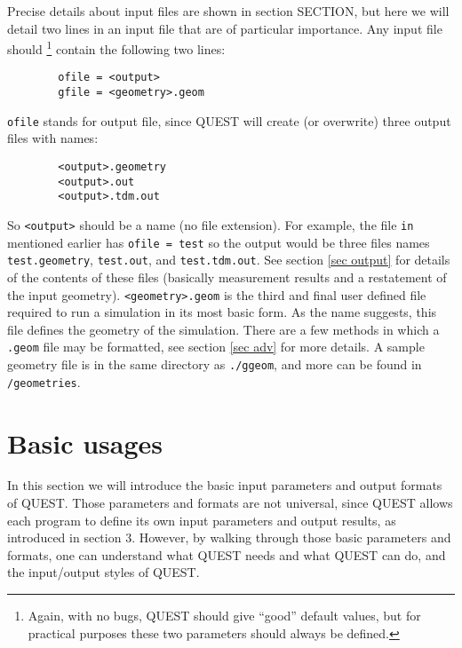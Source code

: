 \documentclass[12pt]{article}
\begin{document}
        Precise details about input files are shown in section SECTION, but here we will detail two lines in an input file that are of particular importance.
        Any input file should \footnote{Again, with no bugs, QUEST should give ``good'' default values, but for practical purposes these two parameters should always be defined.} contain the following two lines:
        \begin{verbatim}
        ofile = <output>
        gfile = <geometry>.geom
        \end{verbatim}
        \texttt{ofile} stands for output file, since QUEST will create (or overwrite) three output files with names:
        \begin{verbatim}
        <output>.geometry
        <output>.out
        <output>.tdm.out
        \end{verbatim}
        So \texttt{<output>} should be a name (no file extension).
        For example, the file \texttt{in} mentioned earlier has \texttt{ofile = test} so the output would be three files names \texttt{test.geometry}, \texttt{test.out}, and \texttt{test.tdm.out}.
        See section \ref{sec output} for details of the contents of these files (basically measurement results and a restatement of the input geometry).
        \texttt{<geometry>.geom} is the third and final user defined file required to run a simulation in its most basic form.
        As the name suggests, this file defines the geometry of the simulation.
        There are a few methods in which a \texttt{.geom} file may be formatted, see section \ref{sec adv} for more details.
        A sample geometry file is in the same directory as \texttt{./ggeom}, and more can be found in \texttt{/geometries}.









\section{Basic usages}
    In this section we will introduce the basic input parameters and output formats of QUEST.
    Those parameters and formats are not universal, since QUEST allows each program to define its own input parameters and output results, as introduced in section 3. However, by walking through those basic parameters and formats, one can understand what QUEST needs and what QUEST can do, and the input/output styles of QUEST.
\end{document}
